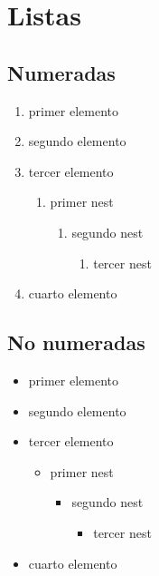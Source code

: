 \documentclass[theorems,spanish]{Marianita}
\begin{document}
{\color{second}\section{Listas}}
\begin{minipage}{0.5\textwidth}
{\color{third}\subsection{Numeradas}}
\begin{enumerate}
    \item primer elemento
    \item segundo elemento
    \item tercer elemento
    \begin{enumerate}
        \item primer nest
        \begin{enumerate}
            \item segundo nest
            \begin{enumerate}
                \item tercer nest
            \end{enumerate}
        \end{enumerate}
    \end{enumerate}
    \item cuarto elemento
\end{enumerate}

{\color{third}\subsection{No numeradas}}
\begin{itemize}
    \item primer elemento
    \item segundo elemento
    \item tercer elemento
    \begin{itemize}
        \item primer nest
        \begin{itemize}
            \item segundo nest
            \begin{itemize}
                \item tercer nest
            \end{itemize}
        \end{itemize}
    \end{itemize}
    \item cuarto elemento
\end{itemize}
\end{minipage}
\end{document}
